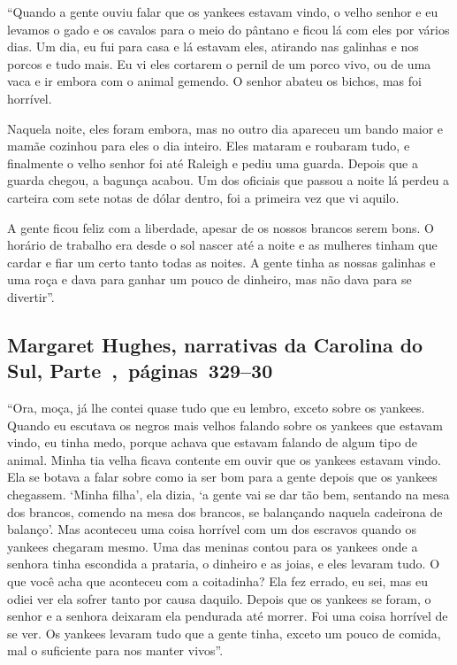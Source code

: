 ``Quando a gente ouviu falar que os yankees estavam vindo, o velho
senhor e eu levamos o gado e os cavalos para o meio do pântano e ficou
lá com eles por vários dias. Um dia, eu fui para casa e lá estavam eles,
atirando nas galinhas e nos porcos e tudo mais. Eu vi eles cortarem o
pernil de um porco vivo, ou de uma vaca e ir embora com o animal
gemendo. O senhor abateu os bichos, mas foi horrível.

Naquela noite, eles foram embora, mas no outro dia apareceu um bando
maior e mamãe cozinhou para eles o dia inteiro. Eles mataram e roubaram
tudo, e finalmente o velho senhor foi até Raleigh e pediu uma guarda.
Depois que a guarda chegou, a bagunça acabou. Um dos oficiais que passou
a noite lá perdeu a carteira com sete notas de dólar dentro, foi a
primeira vez que vi aquilo.

A gente ficou feliz com a liberdade, apesar de os nossos brancos serem
bons. O horário de trabalho era desde o sol nascer até a noite e as
mulheres tinham que cardar e fiar um certo tanto todas as noites. A
gente tinha as nossas galinhas e uma roça e dava para ganhar um pouco de
dinheiro, mas não dava para se divertir''.

\subsection{Margaret Hughes, narrativas da Carolina do Sul, Parte~,~páginas~329--30}
\label{ref155}

``Ora, moça, já lhe contei quase tudo que eu lembro, exceto sobre os
yankees. Quando eu escutava os negros mais velhos falando sobre os
yankees que estavam vindo, eu tinha medo, porque achava que estavam
falando de algum tipo de animal. Minha tia velha ficava contente em
ouvir que os yankees estavam vindo. Ela se botava a falar sobre como ia
ser bom para a gente depois que os yankees chegassem. `Minha filha', ela
dizia, `a gente vai se dar tão bem, sentando na mesa dos brancos,
comendo na mesa dos brancos, se balançando naquela cadeirona de
balanço'. Mas aconteceu uma coisa horrível com um dos escravos quando os
yankees chegaram mesmo. Uma das meninas contou para os yankees onde a
senhora tinha escondida a prataria, o dinheiro e as joias, e eles
levaram tudo. O que você acha que aconteceu com a coitadinha? Ela fez
errado, eu sei, mas eu odiei ver ela sofrer tanto por causa daquilo.
Depois que os yankees se foram, o senhor e a senhora deixaram ela
pendurada até morrer. Foi uma coisa horrível de se ver. Os yankees
levaram tudo que a gente tinha, exceto um pouco de comida, mal o
suficiente para nos manter vivos''.

